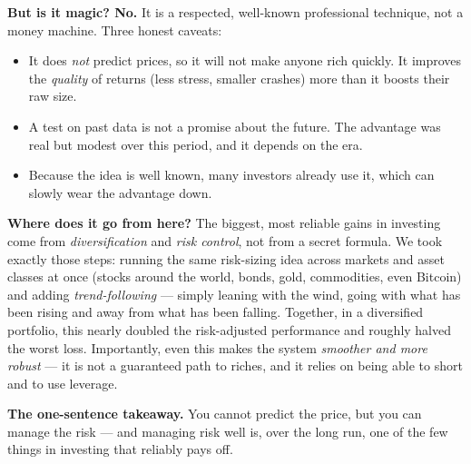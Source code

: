 \documentclass[11pt]{article}
\begin{document}
\textbf{But is it magic? No.} It is a respected, well-known professional
technique, not a money machine. Three honest caveats:
\begin{itemize}[leftmargin=1.4em,itemsep=0.15em]
  \item It does \emph{not} predict prices, so it will not make anyone rich
        quickly. It improves the \emph{quality} of returns (less stress, smaller
        crashes) more than it boosts their raw size.
  \item A test on past data is not a promise about the future. The advantage was
        real but modest over this period, and it depends on the era.
  \item Because the idea is well known, many investors already use it, which can
        slowly wear the advantage down.
\end{itemize}

\textbf{Where does it go from here?} The biggest, most reliable gains in investing
come from \emph{diversification} and \emph{risk control}, not from a secret
formula. We took exactly those steps: running the same risk-sizing idea across
\nAssets{} markets and asset classes at once (stocks around the world, bonds,
gold, commodities, even Bitcoin) and adding \emph{trend-following} --- simply
leaning with the wind, going with what has been rising and away from what has been
falling. Together, in a diversified portfolio, this nearly doubled the
risk-adjusted performance and roughly halved the worst loss. Importantly, even
this makes the system \emph{smoother and more robust} --- it is not a guaranteed
path to riches, and it relies on being able to short and to use leverage.

\textbf{The one-sentence takeaway.} You cannot predict the price, but you can
manage the risk --- and managing risk well is, over the long run, one of the few
things in investing that reliably pays off.
\end{document}
